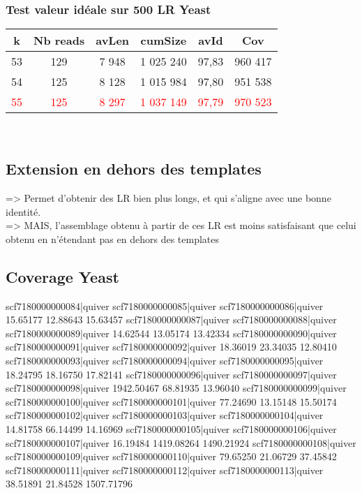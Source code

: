 \documentclass[12pt]{article}
\begin{document}
\subsubsection{Test valeur idéale sur 500 LR Yeast}

\begin{tabular}{|c|c|c|c|c|c|}
	\hline
	k & Nb reads & avLen & cumSize & avId & Cov \\
	\hline
	53 & 129 & 7 948 & 1 025 240 & 97,83 & 960 417 \\
	\hline
	54 & 125 & 8 128 & 1 015 984 & 97,80 & 951 538 \\
	\hline
	\textcolor{red}{55} & \textcolor{red}{125} & \textcolor{red}{8 297} & \textcolor{red}{1 037 149} & \textcolor{red}{97,79} & \textcolor{red}{970 523} \\
	\hline
\end{tabular} \\

\subsection{Extension en dehors des templates}

=> Permet d'obtenir des LR bien plus longs, et qui s'aligne avec une bonne identité. \\
=> MAIS, l'assemblage obtenu à partir de ces LR est moins satisfaisant que celui obtenu en n'étendant pas en dehors des templates

\subsection{Coverage Yeast}

scf7180000000084|quiver scf7180000000085|quiver scf7180000000086|quiver 
               15.65177                12.88643                15.63457 
scf7180000000087|quiver scf7180000000088|quiver scf7180000000089|quiver 
               14.62544                13.05174                13.42334 
scf7180000000090|quiver scf7180000000091|quiver scf7180000000092|quiver 
               18.36019                23.34035                12.80410 
scf7180000000093|quiver scf7180000000094|quiver scf7180000000095|quiver 
               18.24795                18.16750                17.82141 
scf7180000000096|quiver scf7180000000097|quiver scf7180000000098|quiver 
             1942.50467                68.81935                13.96040 
scf7180000000099|quiver scf7180000000100|quiver scf7180000000101|quiver 
               77.24690                13.15148                15.50174 
scf7180000000102|quiver scf7180000000103|quiver scf7180000000104|quiver 
               14.81758                66.14499                14.16969 
scf7180000000105|quiver scf7180000000106|quiver scf7180000000107|quiver 
               16.19484              1419.08264              1490.21924 
scf7180000000108|quiver scf7180000000109|quiver scf7180000000110|quiver 
               79.65250                21.06729                37.45842 
scf7180000000111|quiver scf7180000000112|quiver scf7180000000113|quiver 
               38.51891                21.84528              1507.71796 
\end{document}
